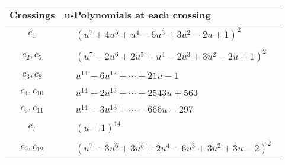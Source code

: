 \documentclass[1p]{elsarticle_modified}
\theoremstyle{definition}
\begin{document}
\begin{tabular}{m{50pt}|m{274pt}}
Crossings & \hspace{64pt}u-Polynomials at each crossing \\
\hline $$\begin{aligned}c_{1}\end{aligned}$$&$\begin{aligned}
&(u^7+4 u^5+u^4-6 u^3+3 u^2-2 u+1)^2
\end{aligned}$\\
\hline $$\begin{aligned}c_{2},c_{5}\end{aligned}$$&$\begin{aligned}
&(u^7-2 u^6+2 u^5+u^4-2 u^3+3 u^2-2 u+1)^2
\end{aligned}$\\
\hline $$\begin{aligned}c_{3},c_{8}\end{aligned}$$&$\begin{aligned}
&u^{14}-6 u^{12}+\cdots+21 u-1
\end{aligned}$\\
\hline $$\begin{aligned}c_{4},c_{10}\end{aligned}$$&$\begin{aligned}
&u^{14}+2 u^{13}+\cdots+2543 u+563
\end{aligned}$\\
\hline $$\begin{aligned}c_{6},c_{11}\end{aligned}$$&$\begin{aligned}
&u^{14}-3 u^{13}+\cdots-666 u-297
\end{aligned}$\\
\hline $$\begin{aligned}c_{7}\end{aligned}$$&$\begin{aligned}
&(u+1)^{14}
\end{aligned}$\\
\hline $$\begin{aligned}c_{9},c_{12}\end{aligned}$$&$\begin{aligned}
&(u^7-3 u^6+3 u^5+2 u^4-6 u^3+3 u^2+3 u-2)^2
\end{aligned}$\\
\hline
\end{tabular}\\~\\
\newpage\renewcommand{\arraystretch}{1}
\end{document}
